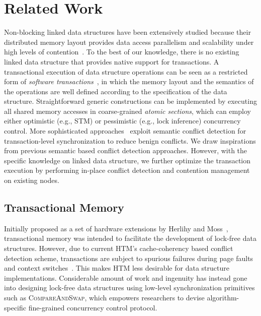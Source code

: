 \documentclass{sig-alternate-05-2015}
\begin{document}
\section{Related Work}
\label{sec:related}
Non-blocking linked data structures have been extensively studied because their distributed memory layout provides data access parallelism and scalability under high levels of contention~\cite{harris2001pragmatic,linden2013skiplist,zhang2015lockfree,michael2002high}.
To the best of our knowledge, there is no existing linked data structure that provides native support for transactions.
A transactional execution of data structure operations can be seen as a restricted form of \emph{software transactions}~\cite{harris2010transactional}, in which the memory layout and the semantics of the operations are well defined according to the specification of the data structure. 
Straightforward generic constructions can be implemented by executing all shared memory accesses in coarse-grained \emph{atomic sections}, which can employ either optimistic (e.g., STM) or pessimistic (e.g., lock inference) concurrency control.
More sophisticated approaches~\cite{bronson2010transactional,herlihy2008transactional,golan2015automatic} exploit semantic conflict detection for transaction-level synchronization to reduce benign conflicts.
We draw inspirations from previous semantic based conflict detection approaches.
However, with the specific knowledge on linked data structure, we further optimize the transaction execution by performing in-place conflict detection and contention management on existing nodes.

\subsection{Transactional Memory}
Initially proposed as a set of hardware extensions by Herlihy and Moss~\cite{herlihy1993transactional}, transactional memory was intended to facilitate the development of lock-free data structures.
However, due to current HTM's cache-coherency based conflict detection scheme, transactions are subject to spurious failures during page faults and context switches~\cite{dice2009early}.
This makes HTM less desirable for data structure implementations.
Considerable amount of work and ingenuity has instead gone into designing lock-free data structures using low-level synchronization primitives such as \textsc{CompareAndSwap}, which empowers researchers to devise algorithm-specific fine-grained concurrency control protocol.
\end{document}
